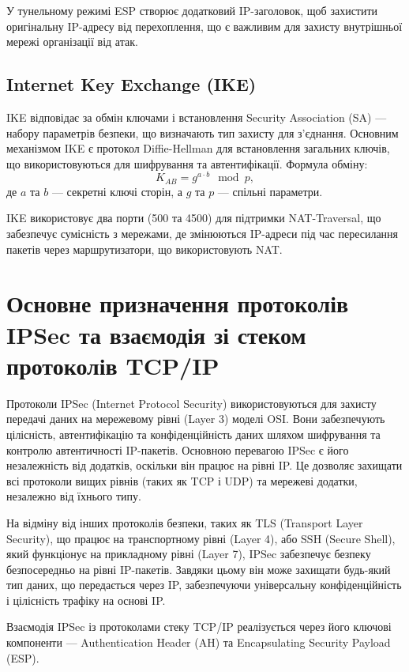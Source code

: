 У тунельному режимі ESP створює додатковий IP-заголовок, щоб захистити оригінальну IP-адресу від перехоплення, що є важливим для захисту внутрішньої мережі організації від атак.

\subsection{Internet Key Exchange (IKE)}

IKE відповідає за обмін ключами і встановлення Security Association (SA) — набору параметрів безпеки, що визначають тип захисту для з'єднання. Основним механізмом IKE є протокол Diffie-Hellman для встановлення загальних ключів, що використовуються для шифрування та автентифікації. Формула обміну:
$$K_{AB} = g^{a \cdot b} \mod p,$$
де $a$ та $b$ — секретні ключі сторін, а $g$ та $p$ — спільні параметри.

IKE використовує два порти (500 та 4500) для підтримки NAT-Traversal, що забезпечує сумісність з мережами, де змінюються IP-адреси під час пересилання пакетів через маршрутизатори, що використовують NAT.

\section{Основне призначення протоколів IPSec та взаємодія зі стеком протоколів TCP/IP}

Протоколи IPSec (Internet Protocol Security) використовуються для захисту передачі даних на мережевому рівні (Layer 3) моделі OSI. Вони забезпечують цілісність, автентифікацію та конфіденційність даних шляхом шифрування та контролю автентичності IP-пакетів. Основною перевагою IPSec є його незалежність від додатків, оскільки він працює на рівні IP. Це дозволяє захищати всі протоколи вищих рівнів (таких як TCP і UDP) та мережеві додатки, незалежно від їхнього типу.

На відміну від інших протоколів безпеки, таких як TLS (Transport Layer Security), що працює на транспортному рівні (Layer 4), або SSH (Secure Shell), який функціонує на прикладному рівні (Layer 7), IPSec забезпечує безпеку безпосередньо на рівні IP-пакетів. Завдяки цьому він може захищати будь-який тип даних, що передається через IP, забезпечуючи універсальну конфіденційність і цілісність трафіку на основі IP.

Взаємодія IPSec із протоколами стеку TCP/IP реалізується через його ключові компоненти — Authentication Header (AH) та Encapsulating Security Payload (ESP).

